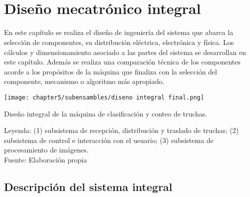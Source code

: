 
\pagestyle{myportland}
\doublespacing
\chapter[\quad\quad\quad\quad ----- Diseño mecatrónico integral]{\\ Diseño mecatrónico integral}
\thispagestyle{myportland}


En este capítulo se realiza el diseño de ingeniería del sistema que abarca la selección de componentes, su distribución eléctrica, electrónica y física. Los cálculos y dimensionamiento asociado a las partes del sistema se desarrollan en este capítulo. Además se realiza una comparación técnica de los componentes acorde a los propósitos de la máquina que finaliza con la selección del componente, mecanismo o algoritmo más apropiado.

\begin{myfigure}[H]
	\footnotesize\centering
	\texttt{[image: chapter5/subensambles/diseno integral final.png]}
	\caption{Diseño integral de la máquina de clasificación y conteo de truchas.}
	\begin{myflushcenter}
		Leyenda: (1) subsistema de recepción, distribución y traslado de truchas; (2) subsistema de control e interacción con el usuario; (3) subsistema de procesamiento de imágenes.\\
		Fuente: Elaboración propia
	\end{myflushcenter}
	\label{fig:diseno integral}
\end{myfigure}

\vspace{-2.0em}

\section{Descripción del sistema integral}
\label{ssec:descripcion del sistema integral}


